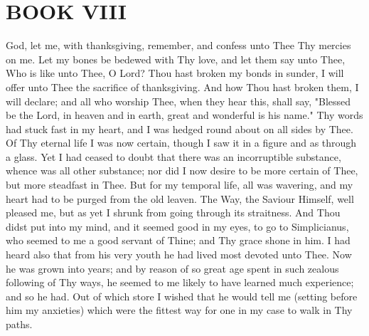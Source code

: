 \documentclass[b5paper,openright,12pt,twoside]{book}
\begin{document}
\chapter{BOOK VIII}


 God, let me, with thanksgiving, remember, and confess unto Thee Thy
mercies on me. Let my bones be bedewed with Thy love, and let them say
unto Thee, Who is like unto Thee, O Lord? Thou hast broken my bonds in
sunder, I will offer unto Thee the sacrifice of thanksgiving. And how
Thou hast broken them, I will declare; and all who worship Thee, when
they hear this, shall say, "Blessed be the Lord, in heaven and in earth,
great and wonderful is his name." Thy words had stuck fast in my heart,
and I was hedged round about on all sides by Thee. Of Thy eternal life I
was now certain, though I saw it in a figure and as through a glass. Yet
I had ceased to doubt that there was an incorruptible substance, whence
was all other substance; nor did I now desire to be more certain of
Thee, but more steadfast in Thee. But for my temporal life, all was
wavering, and my heart had to be purged from the old leaven. The Way,
the Saviour Himself, well pleased me, but as yet I shrunk from going
through its straitness. And Thou didst put into my mind, and it seemed
good in my eyes, to go to Simplicianus, who seemed to me a good servant
of Thine; and Thy grace shone in him. I had heard also that from his
very youth he had lived most devoted unto Thee. Now he was grown into
years; and by reason of so great age spent in such zealous following of
Thy ways, he seemed to me likely to have learned much experience; and
so he had. Out of which store I wished that he would tell me (setting
before him my anxieties) which were the fittest way for one in my case
to walk in Thy paths.
\end{document}
